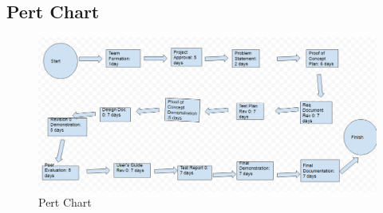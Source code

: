 \documentclass[12pt]{article}
\begin{document}
\subsection{Pert Chart}

\begin{figure}[h!]
\includegraphics[width=17cm]{pert}
\caption{Pert Chart}
\end{figure}
\end{document}

